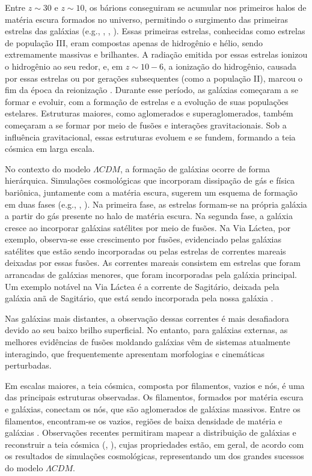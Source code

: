 Entre $z \sim 30$ e $z \sim 10$, os bárions conseguiram se acumular nos primeiros halos de matéria escura formados no universo, permitindo o surgimento das primeiras estrelas das galáxias (e.g., \citealp{Glover_2005}, \citealp{Greif_2015}, \citealp{Schauer_2021}). Essas primeiras estrelas, conhecidas como estrelas de população III, eram compostas apenas de hidrogênio e hélio, sendo extremamente massivas e brilhantes. A radiação emitida por essas estrelas ionizou o hidrogênio ao seu redor, e, em $z \sim 10-6$, a ionização do hidrogênio, causada por essas estrelas ou por gerações subsequentes (como a população II), marcou o fim da época da reionização \citep{Wise_2019}. Durante esse período, as galáxias começaram a se formar e evoluir, com a formação de estrelas e a evolução de suas populações estelares. Estruturas maiores, como aglomerados e superaglomerados, também começaram a se formar por meio de fusões e interações gravitacionais. Sob a influência gravitacional, essas estruturas evoluem e se fundem, formando a teia cósmica em larga escala.

No contexto do modelo $\Lambda CDM$, a formação de galáxias ocorre de forma hierárquica. Simulações cosmológicas que incorporam dissipação de gás e física bariônica, juntamente com a matéria escura, sugerem um esquema de formação em duas fases (e.g., \citealp{Oser_2010}, \citealp{Pillepich_2014}). Na primeira fase, as estrelas formam-se na própria galáxia a partir do gás presente no halo de matéria escura. Na segunda fase, a galáxia cresce ao incorporar galáxias satélites por meio de fusões. Na Via Láctea, por exemplo, observa-se esse crescimento por fusões, evidenciado pelas galáxias satélites que estão sendo incorporadas ou pelas estrelas de correntes mareais deixadas por essas fusões. As correntes mareais consistem em estrelas que foram arrancadas de galáxias menores, que foram incorporadas pela galáxia principal. Um exemplo notável na Via Láctea é a corrente de Sagitário, deixada pela galáxia anã de Sagitário, que está sendo incorporada pela nossa galáxia \citep{Law_2016}.

Nas galáxias mais distantes, a observação dessas correntes é mais desafiadora devido ao seu baixo brilho superficial. No entanto, para galáxias externas, as melhores evidências de fusões moldando galáxias vêm de sistemas atualmente interagindo, que frequentemente apresentam morfologias e cinemáticas perturbadas.

Em escalas maiores, a teia cósmica, composta por filamentos, vazios e nós, é uma das principais estruturas observadas. Os filamentos, formados por matéria escura e galáxias, conectam os nós, que são aglomerados de galáxias massivos. Entre os filamentos, encontram-se os vazios, regiões de baixa densidade de matéria e galáxias \citep{Lindner_1995}. Observações recentes permitiram mapear a distribuição de galáxias e reconstruir a teia cósmica (\citealp{Lindner_1995}, \citealp{Abazajian_2003}), cujas propriedades estão, em geral, de acordo com os resultados de simulações cosmológicas, representando um dos grandes sucessos do modelo $\Lambda CDM$.

